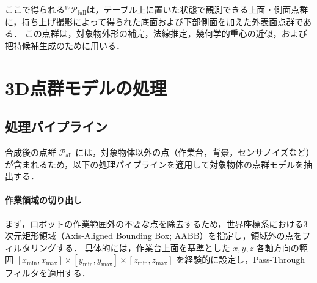 ここで得られる${}^{W}\mathcal{P}_{\mathrm{full}}$は，テーブル上に置いた状態で観測できる上面・側面点群に，持ち上げ撮影によって得られた底面および下部側面を加えた外表面点群である．
この点群は，対象物外形の補完，法線推定，幾何学的重心の近似，および把持候補生成のために用いる．








































\section{3D点群モデルの処理}
\label{sec:system:pointcloud:processing}

\subsection{処理パイプライン}
\label{sec:system:pointcloud:processing:pipeline}

合成後の点群 $\mathcal{P}_{\mathrm{all}}$ には，対象物体以外の点（作業台，背景，センサノイズなど）が含まれるため，以下の処理パイプラインを適用して対象物体の点群モデルを抽出する．

\paragraph{作業領域の切り出し}

まず，ロボットの作業範囲外の不要な点を除去するため，世界座標系における3次元矩形領域（Axis-Aligned Bounding Box; AABB）を指定し，領域外の点をフィルタリングする．
具体的には，作業台上面を基準とした $x, y, z$ 各軸方向の範囲 $[x_{\min}, x_{\max}] \times [y_{\min}, y_{\max}] \times [z_{\min}, z_{\max}]$ を経験的に設定し，Pass-Throughフィルタを適用する．

